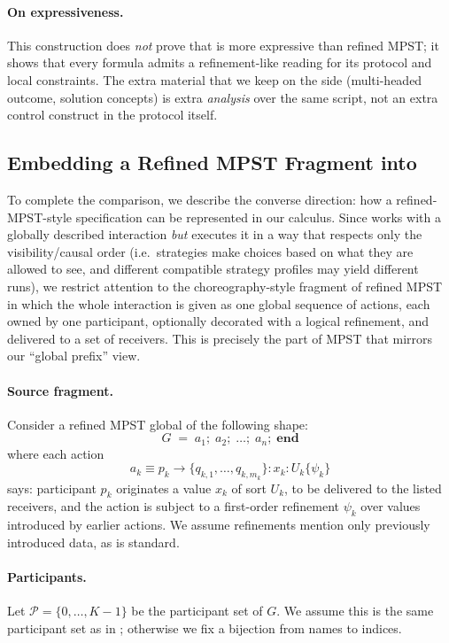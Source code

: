 \paragraph{On expressiveness.}
This construction does \emph{not} prove that \KFOL{} is more expressive than
refined MPST; it shows that every \KFOL{} formula admits a refinement-like
reading for its protocol and local constraints. The extra material that we keep
on the \KFOL{} side (multi-headed outcome, solution concepts) is extra
\emph{analysis} over the same script, not an extra control construct in the
protocol itself.

\subsection{Embedding a Refined MPST Fragment into \KFOL}
\label{sec:embed-rmpst-into-kfol}

To complete the comparison, we describe the converse direction: how a
refined-MPST-style specification can be represented in our calculus. Since
\KFOL{} works with a globally described interaction \emph{but} executes it in a
way that respects only the visibility/causal order (i.e.\ strategies make
choices based on what they are allowed to see, and different compatible
strategy profiles may yield different runs), we restrict attention to the
choreography-style fragment of refined MPST in which the whole interaction is
given as one global sequence of actions, each owned by one participant,
optionally decorated with a logical refinement, and delivered to a set of
receivers. This is precisely the part of MPST that mirrors our “global prefix”
view.

\paragraph{Source fragment.}
Consider a refined MPST global of the following shape:
\[
  G \;=\;
  a_1;\; a_2;\; \dots;\; a_n;\; \mathbf{end}
\]
where each action
\[
  a_k \equiv p_k \to \{q_{k,1},\dots,q_{k,m_k}\} : x_k : U_k \{ \psi_k \}
\]
says: participant $p_k$ originates a value $x_k$ of sort $U_k$, to be delivered
to the listed receivers, and the action is subject to a first-order refinement
$\psi_k$ over values introduced by earlier actions. We assume refinements
mention only previously introduced data, as is standard.

\paragraph{Participants.}
Let $\mathcal{P} = \{0,\dots,K-1\}$ be the participant set of $G$. We assume
this is the same participant set as in \KFOL; otherwise we fix a bijection from
names to indices.

